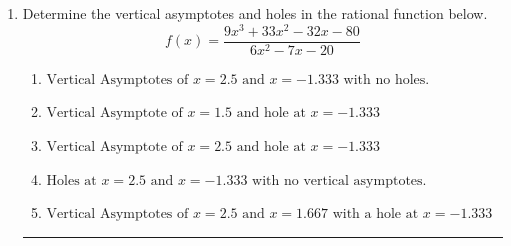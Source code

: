 \documentclass[14pt]{extbook}
\newcommand{\litem}[1]{\item#1\hspace*{-1cm}\rule{\textwidth}{0.4pt}}
\begin{document}
\begin{enumerate}
{\begin{enumerate}[label=\Alph*.]
\end{enumerate} }
\litem{
Determine the vertical asymptotes and holes in the rational function below.\[ f(x) = \frac{9x^{3} +33 x^{2} -32 x -80}{6x^{2} -7 x -20} \]\begin{enumerate}[label=\Alph*.]
\item \( \text{Vertical Asymptotes of } x = 2.5 \text{ and } x = -1.333 \text{ with no holes.} \)
\item \( \text{Vertical Asymptote of } x = 1.5 \text{ and hole at } x = -1.333 \)
\item \( \text{Vertical Asymptote of } x = 2.5 \text{ and hole at } x = -1.333 \)
\item \( \text{Holes at } x = 2.5 \text{ and } x = -1.333 \text{ with no vertical asymptotes.} \)
\item \( \text{Vertical Asymptotes of } x = 2.5 \text{ and } x = 1.667 \text{ with a hole at } x = -1.333 \)

\end{enumerate} }
\end{enumerate}
\end{document}
